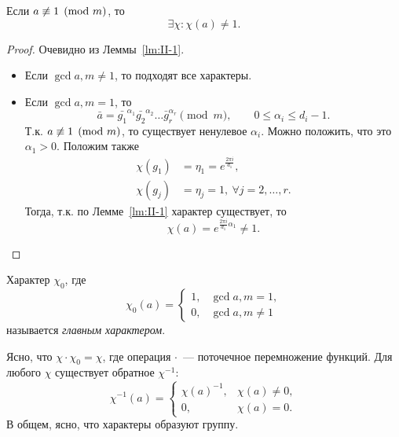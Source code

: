 \begin{nlemma}
\label{lm:II-2}
    Если $a \not\equiv 1 \pmod{m}$, то 
    \[
        \exists \chi\colon \chi(a) \ne 1.
    \]
\end{nlemma}
\begin{proof}
    Очевидно из Леммы~\ref{lm:II-1}.
    \begin{itemize}[label={}]
        \item
            Если $\gcd{a, m} \ne 1$, то подходят все характеры.
        \item
            Если $\gcd{a, m} = 1$, то
            \[
                \bar{a} = \bar{g_1}^{\alpha_1} \bar{g_2}^{\alpha_2} \dots \bar{g}_r^{\alpha_r} \pmod{m}, 
                \qquad 0 \le \alpha_i \le d_i-1.
            \] 
            Т.к. $a \not\equiv 1 \pmod{m}$, то существует ненулевое $\alpha_i$. Можно положить, что это $\alpha_1 > 0$. Положим также 
            \begin{align*}
                \chi\left( g_1 \right) &= \eta_1 = e^{\frac{2\pi i}{d_1}}, \\
                \chi\left( g_j \right) &= \eta_j = 1, \ \forall j = 2, \dots, r.
            \end{align*}
            Тогда, т.к. по Лемме~\ref{lm:II-1} характер существует, то 
            \[
                \chi(a) = e^{\frac{2\pi i}{d_1}\alpha_1} \ne 1.
            \]
    \end{itemize}
\end{proof}

\begin{ndefinition}
\label{II_main-character}
    Характер $\chi_0$, где 
    \[
        \chi_0(a) = 
            \begin{cases}
                1, & \gcd{a, m} = 1, \\
                0, & \gcd{a, m} \ne 1
            \end{cases}
    \]
    называется \emph{главным характером}.
\end{ndefinition}

\begin{remark}
    Ясно, что $\chi \cdot \chi_0 = \chi$, где операция $\cdot$ --- поточечное перемножение функций. Для любого $\chi$ существует обратное $\chi^{-1}$:
    \[
        \chi^{-1}(a) = 
            \begin{cases}
                \chi(a)^{-1}, & \chi(a) \ne 0, \\
                0, & \chi(a) = 0.
            \end{cases}
    \]
    В общем, ясно, что характеры образуют группу.
\end{remark}

